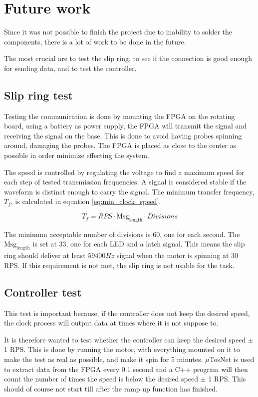 \section{Future work}
Since it was not possible to finish the project due to inability to solder the components, there is a lot of work to be done in the future.
 
The most crucial are to test the slip ring, to see if the connection is good enough for sending data, and to test the controller.

\subsection{Slip ring test}

Testing the communication is done by mounting the FPGA on the rotating board, using a battery as power supply, the FPGA will transmit the signal and receiving the signal on the base.
This is done to avoid having probes spinning around, damaging the probes.
The FPGA is placed as close to the center as possible in order minimize effecting the system.

The speed is controlled by regulating the voltage to find a maximum speed for each step of tested transmission frequencies.
A signal is considered stable if the waveform is distinct enough to carry the signal.
The minimum transfer frequency, $T_f$, is calculated in equation \ref{eq:min_clock_speed}.

\begin{equation}
  T_f = {RPS \cdot \text{Msg}_\text{length} \cdot Divisions }
 \label{eq:min_clock_speed}
\end{equation}

The minimum acceptable number of divisions is 60, one for each second.
The $\text{Msg}_\text{length}$ is set at 33, one for each LED and a latch signal.
This means the slip ring should deliver at least $59400 Hz$ signal when the motor is spinning at 30 RPS.
If this requirement is not met, the slip ring is not usable for the task.

\subsection{Controller test}
This test is important because, if the controller does not keep the desired speed, the clock process will output data at times where it is not suppose to.

It is therefore wanted to test whether the controller can keep the desired speed $\pm$ 1 RPS. 
This is done by running the motor, with everything mounted on it to make the test as real as possible, and make it spin for 5 minutes.
$\mu$TosNet is used to extract data from the FPGA every 0.1 second and a C++ program will then count the number of times the speed is below the desired speed $\pm$ 1 RPS.
This should of course not start till after the ramp up function has finished.


